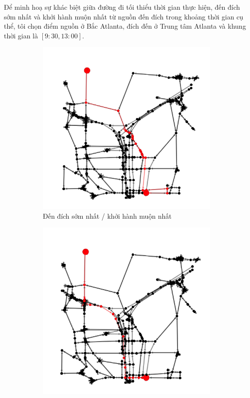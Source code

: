 \documentclass[../main.tex]{subfiles}
\begin{document}
Để minh hoạ sự khác biệt giữa đường đi tối thiểu thời gian thực hiện,
đến đích sớm nhất và khởi hành muộn nhất từ nguồn đến đích trong khoảng
thời gian cụ thể, tôi chọn điểm nguồn ở Bắc Atlanta, đích đến ở Trung
tâm Atlanta và khung thời gian là \([9:30, 13:00]\).


\begin{figure}
    \begin{subfigure}{0.5\textwidth}
        \centering
        \includegraphics{edited-images/Figure16a.jpg}
        \caption{Đến đích sớm nhất / khởi hành muộn nhất}
        \label{fig:16a}
    \end{subfigure}
    \begin{subfigure}{0.5\textwidth}
        \centering
        \includegraphics{edited-images/Figure16b.jpg}

\end{subfigure}
\end{figure}
\end{document}
